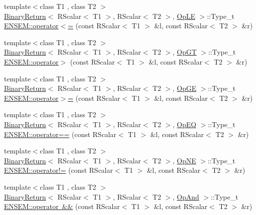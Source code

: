 \begin{DoxyCompactItemize}
\item 
{\footnotesize template$<$class T1 , class T2 $>$ }\\\mbox{\hyperlink{structBinaryReturn}{Binary\+Return}}$<$ R\+Scalar$<$ T1 $>$, R\+Scalar$<$ T2 $>$, \mbox{\hyperlink{structOpLE}{Op\+LE}} $>$\+::Type\+\_\+t \mbox{\hyperlink{group__rscalar_ga17ac158bc4a28aed7618e341087e8084}{E\+N\+S\+E\+M\+::operator$<$=}} (const R\+Scalar$<$ T1 $>$ \&l, const R\+Scalar$<$ T2 $>$ \&r)
\item 
{\footnotesize template$<$class T1 , class T2 $>$ }\\\mbox{\hyperlink{structBinaryReturn}{Binary\+Return}}$<$ R\+Scalar$<$ T1 $>$, R\+Scalar$<$ T2 $>$, \mbox{\hyperlink{structOpGT}{Op\+GT}} $>$\+::Type\+\_\+t \mbox{\hyperlink{group__rscalar_ga7e63d3683975042d12f1fb51499b95ff}{E\+N\+S\+E\+M\+::operator$>$}} (const R\+Scalar$<$ T1 $>$ \&l, const R\+Scalar$<$ T2 $>$ \&r)
\item 
{\footnotesize template$<$class T1 , class T2 $>$ }\\\mbox{\hyperlink{structBinaryReturn}{Binary\+Return}}$<$ R\+Scalar$<$ T1 $>$, R\+Scalar$<$ T2 $>$, \mbox{\hyperlink{structOpGE}{Op\+GE}} $>$\+::Type\+\_\+t \mbox{\hyperlink{group__rscalar_ga48e571bcedcc6e54b313673e6c64b759}{E\+N\+S\+E\+M\+::operator$>$=}} (const R\+Scalar$<$ T1 $>$ \&l, const R\+Scalar$<$ T2 $>$ \&r)
\item 
{\footnotesize template$<$class T1 , class T2 $>$ }\\\mbox{\hyperlink{structBinaryReturn}{Binary\+Return}}$<$ R\+Scalar$<$ T1 $>$, R\+Scalar$<$ T2 $>$, \mbox{\hyperlink{structOpEQ}{Op\+EQ}} $>$\+::Type\+\_\+t \mbox{\hyperlink{group__rscalar_ga7c4b4d964b61ea096a84dc01a77fee5b}{E\+N\+S\+E\+M\+::operator==}} (const R\+Scalar$<$ T1 $>$ \&l, const R\+Scalar$<$ T2 $>$ \&r)
\item 
{\footnotesize template$<$class T1 , class T2 $>$ }\\\mbox{\hyperlink{structBinaryReturn}{Binary\+Return}}$<$ R\+Scalar$<$ T1 $>$, R\+Scalar$<$ T2 $>$, \mbox{\hyperlink{structOpNE}{Op\+NE}} $>$\+::Type\+\_\+t \mbox{\hyperlink{group__rscalar_gacbd0811ec4f0f394ce57abefb7e699fc}{E\+N\+S\+E\+M\+::operator!=}} (const R\+Scalar$<$ T1 $>$ \&l, const R\+Scalar$<$ T2 $>$ \&r)
\item 
{\footnotesize template$<$class T1 , class T2 $>$ }\\\mbox{\hyperlink{structBinaryReturn}{Binary\+Return}}$<$ R\+Scalar$<$ T1 $>$, R\+Scalar$<$ T2 $>$, \mbox{\hyperlink{structOpAnd}{Op\+And}} $>$\+::Type\+\_\+t \mbox{\hyperlink{group__rscalar_ga142a7a22c88f64f590411925c5c3cdcd}{E\+N\+S\+E\+M\+::operator \&\&}} (const R\+Scalar$<$ T1 $>$ \&l, const R\+Scalar$<$ T2 $>$ \&r)

\end{DoxyCompactItemize}
